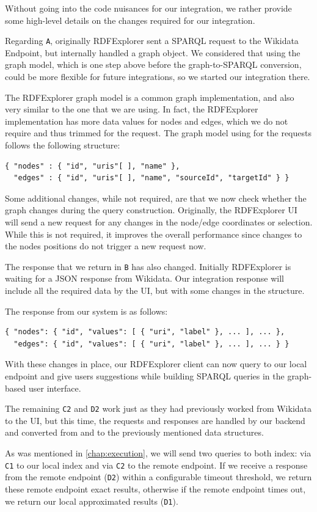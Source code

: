 Without going into the code nuisances for our integration, we rather provide some high-level details on the changes required for our integration. 

Regarding \texttt{A}, originally RDFExplorer sent a SPARQL request to the Wikidata Endpoint, but internally handled a graph object. We considered that using the graph model, which is one step above before the graph-to-SPARQL conversion, could be more flexible for future integrations, so we started our integration there.

The RDFExplorer graph model is a common graph implementation, and also very similar to the one that we are using. In fact, the RDFExplorer implementation has more data values for nodes and edges, which we do not require and thus trimmed for the request. The graph model using for the requests follows the following structure:
\begin{verbatim}
{ "nodes" : { "id", "uris"[ ], "name" },
  "edges" : { "id", "uris"[ ], "name", "sourceId", "targetId" } }
\end{verbatim}

Some additional changes, while not required, are that we now check whether the graph  changes during the query construction. Originally, the RDFExplorer UI will send a new request for any changes in the node/edge coordinates or selection. While this is not required, it improves the overall performance since changes to the nodes positions do not trigger a new request now. 

The response that we return in \texttt{B} has also changed. Initially RDFExplorer is waiting for a JSON response from Wikidata. Our integration response will include all the required data by the UI, but with some changes in the structure. 

The response from our system is as follows:
\begin{verbatim}
{ "nodes": { "id", "values": [ { "uri", "label" }, ... ], ... },
  "edges": { "id", "values": [ { "uri", "label" }, ... ], ... } }
\end{verbatim}

With these changes in place, our RDFExplorer client can now query to our local endpoint and give users suggestions while building SPARQL queries in the graph-based user interface.

The remaining \texttt{C2} and \texttt{D2} work just as they had previously worked from Wikidata to the UI, but this time, the requests and responses are handled by our backend and converted from and to the previously mentioned data structures.

As was mentioned in \autoref{chap:execution}, we will send two queries to both index: via \texttt{C1} to our local index and via \texttt{C2} to the remote endpoint. If we receive a response from the remote endpoint (\texttt{D2}) within a configurable timeout threshold, we return these remote endpoint exact results, otherwise if the remote endpoint times out, we return our local approximated results (\texttt{D1}).

